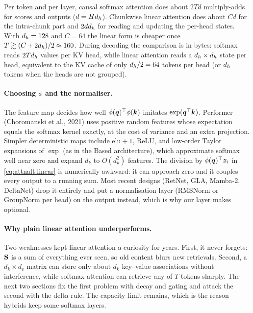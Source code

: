 \begin{napkinmath}
Per token and per layer, causal softmax attention does about $2Td$ multiply-adds for scores and outputs
($d=Hd_{h}$). Chunkwise linear attention does about $Cd$ for the intra-chunk part and $2dd_{h}$ for
reading and updating the per-head states. With $d_{h}=128$ and $C=64$ the linear form is cheaper once
$T\gtrsim (C+2d_{h})/2\approx160$. During decoding the comparison is in bytes: softmax reads $2Td_{h}$
values per KV head, while linear attention reads a $d_{h}\times d_{h}$ state per head, equivalent to the KV
cache of only $d_{h}/2=64$ tokens per head (or $d_{h}$ tokens when the heads are not grouped).
\end{napkinmath}

\paragraph{Choosing $\phi$ and the normaliser.} The feature map decides how well $\phi(\bm{q})^\top\phi(\bm{k})$
imitates $\exp(\bm{q}^\top\bm{k})$. Performer (Choromanski et al., 2021) uses positive random features
whose expectation equals the softmax kernel exactly, at the cost of variance and an extra projection.
Simpler deterministic maps include $\mathrm{elu}+1$, ReLU, and low-order Taylor expansions of $\exp$
(as in the Based architecture), which approximate softmax well near zero and expand $d_k$ to $O(d_k^2)$
features. The division by $\phi(\bm{q})^\top\bm{z}_i$ in \cref{eq:attnalt:linear} is numerically awkward:
it can approach zero and it couples every output to a running sum. Most recent designs (RetNet, GLA,
Mamba-2, DeltaNet) drop it entirely and put a normalisation layer (RMSNorm or GroupNorm per head) on the
output instead, which is why our layer makes  optional.

\paragraph{Why plain linear attention underperforms.} Two weaknesses kept linear attention a curiosity
for years. First, it never forgets: $\mathbf{S}$ is a sum of everything ever seen, so old content blurs new
retrievals. Second, a $d_k\times d_v$ matrix can store only about $d_k$ key--value associations without
interference, while softmax attention can retrieve any of $T$ tokens sharply. The next two sections fix the
first problem with decay and gating and attack the second with the delta rule. The capacity limit
remains, which is the reason hybrids keep some softmax layers.

